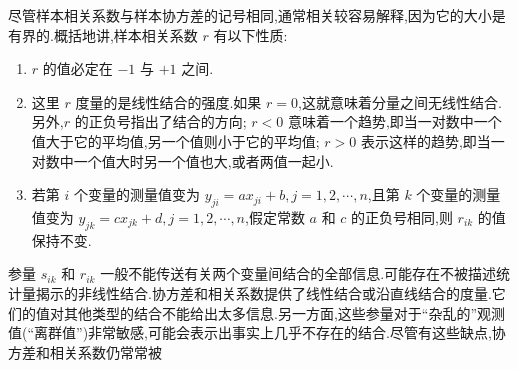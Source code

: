 尽管样本相关系数与样本协方差的记号相同,通常相关较容易解释,因为它的大小是有界的.概括地讲,样本相关系数 $r$ 有以下性质:

\begin{enumerate}[label=\arabic*.,leftmargin=*,itemsep=2pt]
\item $r$ 的值必定在 $-1$ 与 $+1$ 之间.
\item 这里 $r$ 度量的是线性结合的强度.如果 $r=0$,这就意味着分量之间无线性结合.另外,$r$ 的正负号指出了结合的方向; $r<0$ 意味着一个趋势,即当一对数中一个值大于它的平均值,另一个值则小于它的平均值; $r>0$ 表示这样的趋势,即当一对数中一个值大时另一个值也大,或者两值一起小.
\item 若第 $i$ 个变量的测量值变为 $y_{ji}=ax_{ji}+b, j=1,2,\cdots,n$,且第 $k$ 个变量的测量值变为 $y_{jk}=cx_{jk}+d, j=1,2,\cdots,n$,假定常数 $a$ 和 $c$ 的正负号相同,则 $r_{ik}$ 的值保持不变.
\end{enumerate}

参量 $s_{ik}$ 和 $r_{ik}$ 一般不能传送有关两个变量间结合的全部信息.可能存在不被描述统计量揭示的非线性结合.协方差和相关系数提供了线性结合或沿直线结合的度量.它们的值对其他类型的结合不能给出太多信息.另一方面,这些参量对于“杂乱的”观测值(“离群值”)非常敏感,可能会表示出事实上几乎不存在的结合.尽管有这些缺点,协方差和相关系数仍常常被



